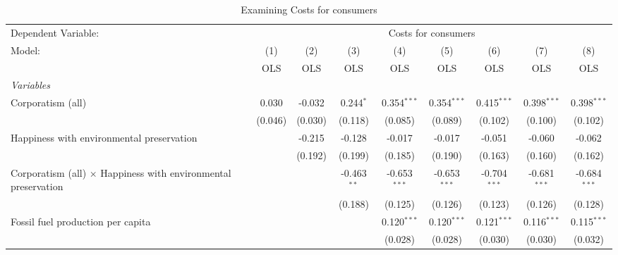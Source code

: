 
\begin{table}[htbp]
   \caption{Examining Costs for consumers}
   \centering
   \begin{tabular}{lcccccccc}
      \toprule
      Dependent Variable: & \multicolumn{8}{c}{Costs for consumers}\\
      Model:                                                                & (1)     & (2)     & (3)           & (4)            & (5)            & (6)            & (7)            & (8)\\  
                                                                            &  OLS    & OLS     & OLS           & OLS            & OLS            & OLS            & OLS            & OLS\\  
      \midrule
      \emph{Variables}\\
      Corporatism (all)                                                     & 0.030   & -0.032  & 0.244$^{*}$   & 0.354$^{***}$  & 0.354$^{***}$  & 0.415$^{***}$  & 0.398$^{***}$  & 0.398$^{***}$\\   
                                                                            & (0.046) & (0.030) & (0.118)       & (0.085)        & (0.089)        & (0.102)        & (0.100)        & (0.102)\\   
      Happiness with environmental preservation                             &         & -0.215  & -0.128        & -0.017         & -0.017         & -0.051         & -0.060         & -0.062\\   
                                                                            &         & (0.192) & (0.199)       & (0.185)        & (0.190)        & (0.163)        & (0.160)        & (0.162)\\   
      Corporatism (all) $\times$ Happiness with environmental preservation  &         &         & -0.463$^{**}$ & -0.653$^{***}$ & -0.653$^{***}$ & -0.704$^{***}$ & -0.681$^{***}$ & -0.684$^{***}$\\   
                                                                            &         &         & (0.188)       & (0.125)        & (0.126)        & (0.123)        & (0.126)        & (0.128)\\   
      Fossil fuel production per capita                                     &         &         &               & 0.120$^{***}$  & 0.120$^{***}$  & 0.121$^{***}$  & 0.116$^{***}$  & 0.115$^{***}$\\   
                                                                            &         &         &               & (0.028)        & (0.028)        & (0.030)        & (0.030)        & (0.032)\\   

\end{tabular}
\end{table}
